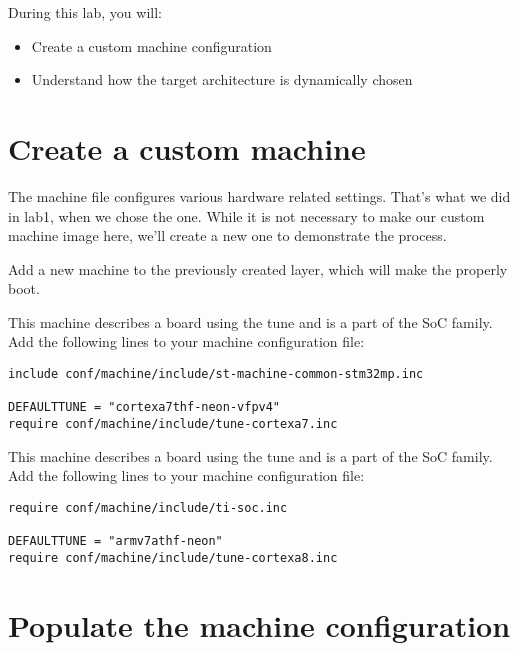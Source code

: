 
During this lab, you will:
\begin{itemize}
  \item Create a custom machine configuration
  \item Understand how the target architecture is dynamically chosen
\end{itemize}

\section{Create a custom machine}

The machine file configures various hardware related settings. That's
what we did in lab1, when we chose the 
{} {} one. While it
is not necessary to make our custom machine image here, we'll create a
new one to demonstrate the process.

Add a new  machine to the previously created layer, which
will make the
 properly
boot.

\if{}
This machine describes a board using the 
tune and is a part of the  SoC family. Add the following
lines to your machine configuration file:

\begin{verbatim}
include conf/machine/include/st-machine-common-stm32mp.inc

DEFAULTTUNE = "cortexa7thf-neon-vfpv4"
require conf/machine/include/tune-cortexa7.inc
\end{verbatim}
\else
This machine describes a board using the  tune
and is a part of the  SoC family. Add the following lines
to your machine configuration file:

\begin{verbatim}
require conf/machine/include/ti-soc.inc

DEFAULTTUNE = "armv7athf-neon"
require conf/machine/include/tune-cortexa8.inc
\end{verbatim}
\fi
\section{Populate the machine configuration}

